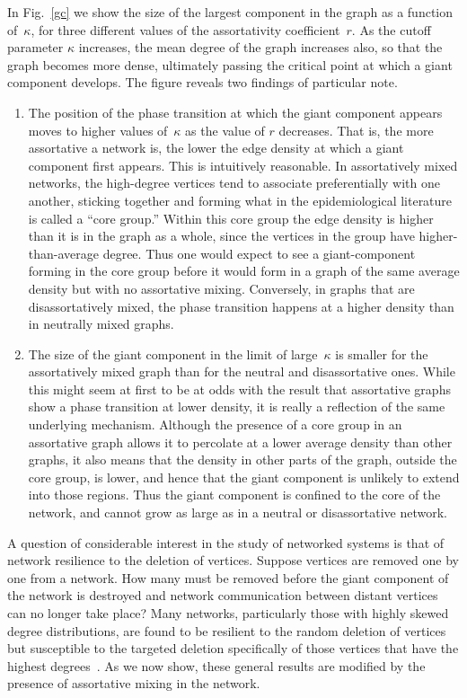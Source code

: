 \documentclass[twocolumn,pre]{revtex4}
\begin{document}
In Fig.~\ref{gc} we show the size of the largest component in the graph as
a function of~$\kappa$, for three different values of the assortativity
coefficient~$r$.  As the cutoff parameter $\kappa$ increases, the mean
degree of the graph increases also, so that the graph becomes more dense,
ultimately passing the critical point at which a giant component develops.
The figure reveals two findings of particular note.
\begin{enumerate}
\item The position of the phase transition at which the giant component
appears moves to higher values of~$\kappa$ as the value of $r$ decreases.
That is, the more assortative a network is, the lower the edge density at
which a giant component first appears.  This is intuitively reasonable.  In
assortatively mixed networks, the high-degree vertices tend to associate
preferentially with one another, sticking together and forming what in the
epidemiological literature is called a ``core group.''  Within this core
group the edge density is higher than it is in the graph as a whole, since
the vertices in the group have higher-than-average degree.  Thus one would
expect to see a giant-component forming in the core group before it would
form in a graph of the same average density but with no assortative mixing.
Conversely, in graphs that are disassortatively mixed, the phase transition
happens at a higher density than in neutrally mixed graphs.
\item The size of the giant component in the limit of large~$\kappa$ is
smaller for the assortatively mixed graph than for the neutral and
disassortative ones.  While this might seem at first to be at odds with the
result that assortative graphs show a phase transition at lower density, it
is really a reflection of the same underlying mechanism.  Although the
presence of a core group in an assortative graph allows it to percolate at
a lower average density than other graphs, it also means that the density
in other parts of the graph, outside the core group, is lower, and hence
that the giant component is unlikely to extend into those regions.  Thus
the giant component is confined to the core of the network, and cannot grow
as large as in a neutral or disassortative network.
\end{enumerate}

A question of considerable interest in the study of networked systems is
that of network resilience to the deletion of vertices.  Suppose vertices
are removed one by one from a network.  How many must be removed before the
giant component of the network is destroyed and network communication
between distant vertices can no longer take place?  Many networks,
particularly those with highly skewed degree distributions, are found to be
resilient to the random deletion of vertices but susceptible to the
targeted deletion specifically of those vertices that have the highest
degrees~\cite{AJB00,Broder00,CNSW00,CEBH01}.  As we now show, these general
results are modified by the presence of assortative mixing in the network.
\end{document}
